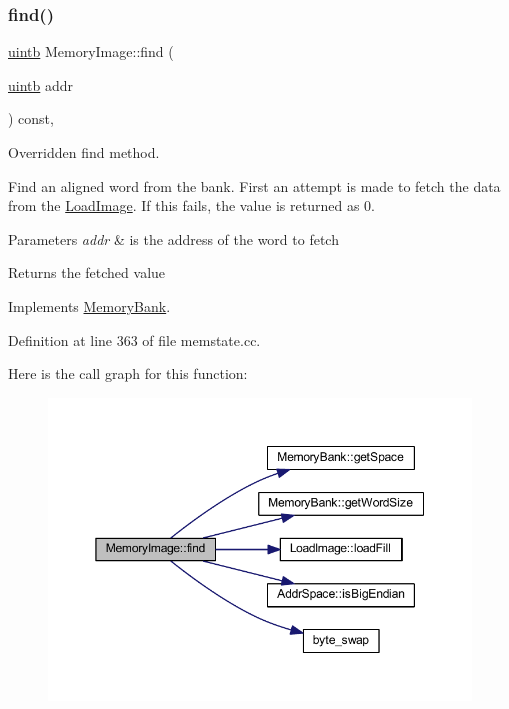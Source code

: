 \subsubsection{\texorpdfstring{find()}{find()}}
{\footnotesize\ttfamily \mbox{\hyperlink{types_8h_a2db313c5d32a12b01d26ac9b3bca178f}{uintb}} Memory\+Image\+::find (\begin{DoxyParamCaption}\item[{\mbox{\hyperlink{types_8h_a2db313c5d32a12b01d26ac9b3bca178f}{uintb}}}]{addr }\end{DoxyParamCaption}) const\hspace{0.3cm}{\ttfamily [protected]}, {\ttfamily [virtual]}}



Overridden find method. 

Find an aligned word from the bank. First an attempt is made to fetch the data from the \mbox{\hyperlink{class_load_image}{Load\+Image}}. If this fails, the value is returned as 0. 
\begin{DoxyParams}{Parameters}
{\em addr} & is the address of the word to fetch \\
\hline
\end{DoxyParams}
\begin{DoxyReturn}{Returns}
the fetched value 
\end{DoxyReturn}


Implements \mbox{\hyperlink{class_memory_bank_a421a5b8dd872d0c3e462d9055fa4266d}{Memory\+Bank}}.



Definition at line 363 of file memstate.\+cc.

Here is the call graph for this function\+:
\nopagebreak
\begin{figure}[H]
\begin{center}
\leavevmode
\includegraphics[width=350pt]{class_memory_image_a196464ef9a11a0088aa62d01e510aabf_cgraph}
\end{center}
\end{figure}
\mbox{\label{class_memory_image_abcf3229adb6b824702b627d1de5a9f10}} 
